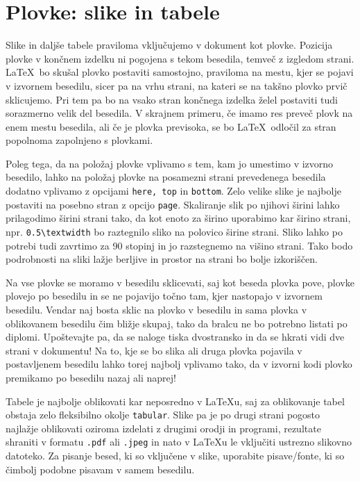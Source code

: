 \documentclass[a4paper,12pt,openright]{book}
\begin{document}
\chapter{Plovke: slike in tabele}
\label{ch2}

Slike in daljše tabele praviloma vključujemo v dokument kot plovke. 
Pozicija plovke v končnem izdelku ni pogojena s tekom besedila, temveč z izgledom strani. 
\LaTeX\ bo skušal plovko postaviti samostojno, praviloma na mestu, kjer se pojavi v izvornem besedilu, sicer pa na 
vrhu strani, na kateri se na takšno plovko prvič sklicujemo. 
Pri tem pa bo na vsako stran končnega izdelka želel postaviti tudi sorazmerno velik del besedila. 
V skrajnem primeru, če imamo res preveč plovk na enem mestu besedila, ali če je plovka previsoka, se bo \LaTeX\ odločil za stran popolnoma zapolnjeno s plovkami.

Poleg tega, da na položaj plovke vplivamo s tem, kam jo umestimo v izvorno besedilo, lahko na položaj plovke na posamezni strani prevedenega besedila dodatno vplivamo z opcijami \texttt{here, top} in \texttt{bottom}.
Zelo velike slike je najbolje postaviti na posebno stran z opcijo \texttt{page}.
Skaliranje slik po njihovi širini lahko prilagodimo širini strani tako, da kot enoto za širino uporabimo kar širino strani, npr. \verb=0.5\textwidth= bo raztegnilo sliko na polovico širine strani.
Sliko lahko po potrebi tudi zavrtimo za 90 stopinj in jo razstegnemo na višino strani. 
Tako bodo podrobnosti na sliki lažje berljive in prostor na strani bo bolje izkoriščen.

Na vse plovke se moramo v besedilu sklicevati, saj kot beseda plovka pove, plovke plovejo po besedilu in se ne pojavijo točno tam, kjer nastopajo v izvornem besedilu.
Vendar naj bosta  sklic na plovko v besedilu in sama plovka v oblikovanem besedilu čim bližje skupaj, tako da bralcu ne bo potrebno listati po diplomi. 
Upoštevajte pa, da se naloge tiska dvostransko in da se hkrati vidi dve strani v dokumentu!
Na to, kje se bo slika ali druga plovka pojavila v postavljenem besedilu lahko torej najbolj vplivamo tako, da v izvorni kodi plovko premikamo po besedilu nazaj ali naprej!

Tabele je najbolje oblikovati kar neposredno v \LaTeX u, saj za oblikovanje tabel obstaja zelo fleksibilno okolje \texttt{tabular}.
Slike pa je po drugi strani  pogosto najla\v zje oblikovati oziroma izdelati z drugimi orodji in programi, rezultate shraniti v formatu {\tt .pdf} ali {\tt .jpeg} in nato v \LaTeX u le vključiti ustrezno slikovno datoteko. Za pisanje besed, ki so vključene v slike, uporabite pisave/fonte, ki so čimbolj podobne pisavam v samem besedilu.
\end{document}

